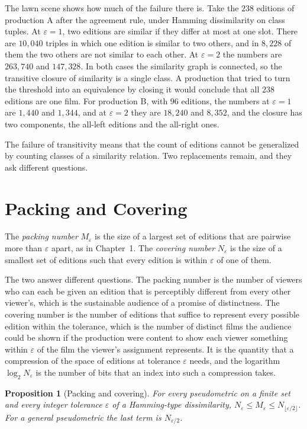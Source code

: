\documentclass[11pt,twoside,openright]{book}
\theoremstyle{plain}
\newtheorem{proposition}[theorem]{Proposition}
\theoremstyle{definition}
\theoremstyle{remark}
\begin{document}
The lawn scene shows how much of the failure there is. Take the $238$ editions of production A after the agreement rule, under Hamming dissimilarity on class tuples. At $\varepsilon=1$, two editions are similar if they differ at most at one slot. There are $10{,}040$ triples in which one edition is similar to two others, and in $8{,}228$ of them the two others are not similar to each other. At $\varepsilon=2$ the numbers are $263{,}740$ and $147{,}328$. In both cases the similarity graph is connected, so the transitive closure of similarity is a single class. A production that tried to turn the threshold into an equivalence by closing it would conclude that all $238$ editions are one film. For production B, with $96$ editions, the numbers at $\varepsilon=1$ are $1{,}440$ and $1{,}344$, and at $\varepsilon=2$ they are $18{,}240$ and $8{,}352$, and the closure has two components, the all-left editions and the all-right ones.

The failure of transitivity means that the count of editions cannot be generalized by counting classes of a similarity relation. Two replacements remain, and they ask different questions.

\section{Packing and Covering}\label{sec:packcover}

The \emph{packing number} $M_\varepsilon$ is the size of a largest set of editions that are pairwise more than $\varepsilon$ apart, as in Chapter~1. The \emph{covering number} $N_\varepsilon$ is the size of a smallest set of editions such that every edition is within $\varepsilon$ of one of them.

The two answer different questions. The packing number is the number of viewers who can each be given an edition that is perceptibly different from every other viewer's, which is the sustainable audience of a promise of distinctness. The covering number is the number of editions that suffice to represent every possible edition within the tolerance, which is the number of distinct films the audience could be shown if the production were content to show each viewer something within $\varepsilon$ of the film the viewer's assignment represents. It is the quantity that a compression of the space of editions at tolerance $\varepsilon$ needs, and the logarithm $\log_2N_\varepsilon$ is the number of bits that an index into such a compression takes.

\begin{proposition}[Packing and covering]\label{prop:pc}
For every pseudometric on a finite set and every integer tolerance $\varepsilon$ of a Hamming-type dissimilarity, $N_\varepsilon\le M_\varepsilon\le N_{\lfloor\varepsilon/2\rfloor}$. For a general pseudometric the last term is $N_{\varepsilon/2}$.
\end{proposition}
\end{document}
